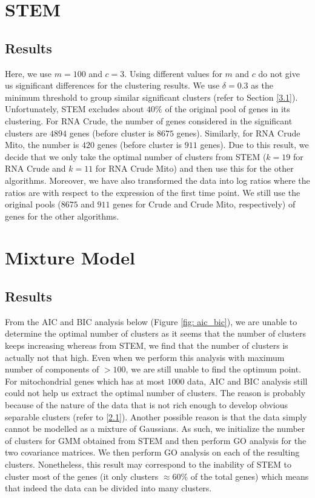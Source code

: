 \section{STEM}
\subsection{Results}
Here, we use $m=100$ and $c=3$. Using different values for $m$ and $c$ do not give us significant differences for the clustering results. We use $\delta = 0.3$ as the minimum threshold to group similar significant clusters (refer to Section \ref{3.1}). Unfortunately, STEM excludes about $40\%$ of the original pool of genes in its clustering. For RNA Crude, the number of genes considered in the significant clusters are $4894$ genes (before cluster is $8675$ genes). Similarly, for RNA Crude Mito, the number is $420$ genes (before cluster is $911$ genes). Due to this result, we decide that we only take the optimal number of clusters from STEM ($k=19$ for RNA Crude and $k=11$ for RNA Crude Mito) and then use this for the other algorithms. Moreover, we have also transformed the data into log ratios where the ratios are with respect to the expression of the first time point. We still use the original pools ($8675$ and $911$ genes for Crude and Crude Mito, respectively) of genes for the other algorithms.


\section{Mixture Model}
\subsection{Results}
From the AIC and BIC analysis below (Figure \ref{fig: aic_bic}), we are unable to determine the optimal number of clusters as it seems that the number of clusters keeps increasing whereas from STEM, we find that the number of clusters is actually not that high. Even when we perform this analysis with maximum number of components of $>100$, we are still unable to find the optimum point. For mitochondrial genes which has at most $1000$ data, AIC and BIC analysis still could not help us extract the optimal number of clusters. The reason is probably because of the nature of the data that is not rich enough to develop obvious separable clusters (refer to \ref{2.1}). Another possible reason is that the data simply cannot be modelled as a mixture of Gaussians. As such, we initialize the number of clusters for GMM obtained from STEM and then perform GO analysis for the two covariance matrices. We then perform GO analysis on each of the resulting clusters. Nonetheless, this result may correspond to the inability of STEM to cluster most of the genes (it only clusters $\approx 60 \%$ of the total genes) which means that indeed the data can be divided into many clusters.

